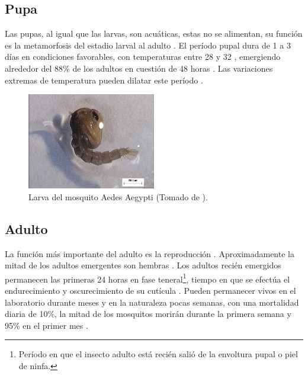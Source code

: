 \subsection{Pupa}
\label{subsec:ciclo-biologico-pupa}
Las pupas, al igual que las larvas, son acuáticas, estas no se alimentan, su función es la
metamorfosis del estadio larval al adulto \cite{ThironIzcazaJ2003}. El período pupal dura de 1
a 3 días en condiciones favorables, con temperaturas entre 28 y 32 \textcelsius
\cite{web-site:gMonteroBiologia}, emergiendo alrededor del 88\% de los adultos en cuestión de 48
horas \cite{ThironIzcazaJ2003}. Las variaciones extremas de temperatura pueden dilatar este período
\cite{web-site:gMonteroBiologia}.

\begin{figure}
\centering
\includegraphics[width=0.5\textwidth]{capitulo-3/graphics/pupa.png}
\caption{\label{fig:cap3-larvas} Larva del mosquito Aedes Aegypti (Tomado de
\cite{sivanathan2006ecology}).}
\end{figure}

\subsection{Adulto}
\label{subsec:ciclo-biologico-adulto}
La función más importante del adulto es la reproducción \cite{ThironIzcazaJ2003}. Aproximadamente
la mitad de los adultos emergentes son hembras \cite{otero2006stochastic, manrique1998desarrollo}.
Los adultos recién emergidos permanecen las primeras 24 horas en fase teneral\footnote{Período en
que el insecto adulto está recién salió de la envoltura pupal o piel de ninfa.}, tiempo en que se
efectúa el endurecimiento y oscurecimiento de su cutícula \cite{luevano1993ciclo}. Pueden
permanecer vivos en el laboratorio durante meses y en la naturaleza pocas semanas, con una
mortalidad diaria de 10\%, la mitad de los mosquitos morirán durante la primera semana y 95\% en
el primer mes \cite{ThironIzcazaJ2003}.

